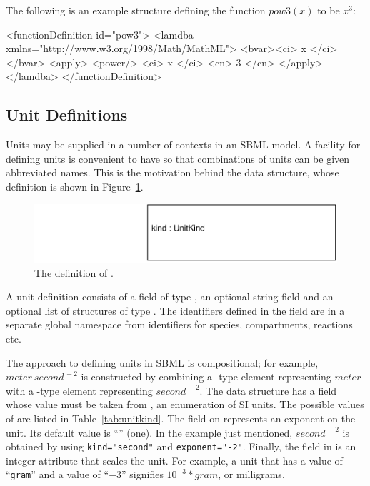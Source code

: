 \documentclass[10pt,twocolumntoc]{cekarticle}
\newcommand{\vref}[1]{\ref{#1}}
\begin{document}
The following is an example  structure defining
the function $pow3(x)$ to be $x^{3}$:

\begin{example}
<functionDefinition id="pow3">
    <lamdba xmlns="http://www.w3.org/1998/Math/MathML">
        <bvar><ci> x </ci></bvar>
        <apply>
            <power/>
            <ci> x </ci>
            <cn> 3 </cn>
        </apply>
    </lamdba>
</functionDefinition>
\end{example}

\subsection{Unit Definitions}
\label{sec:unitdefinitions}

Units may be supplied in a number of contexts in an SBML model.  A
facility for defining units is convenient to have so that
combinations of units can be given abbreviated names.  This is the
motivation behind the  data structure, whose
definition is shown in Figure~\vref{fig:unitdefinition}.

\begin{figure}[htb]
  \centering
  \includegraphics[scale = 0.68]{unitdefinition}
  \caption{The definition of .}
  \label{fig:unitdefinition}
\end{figure}

A unit definition consists of a  field of type
, an optional string field  and an
optional list of structures of type . The identifiers
defined in the  field are in a separate global
namespace from identifiers for species, compartments, reactions
etc.

The approach to defining units in SBML is compositional; for
example, $meter\ second^{\,-2}$ is constructed by combining a
-type element representing $meter$ with a
-type element representing $second^{\,-2}$.  The
 data structure has a  field whose value
must be taken from , an enumeration of SI units.
The possible values of  are listed in
Table~\vref{tab:unitkind}.  The  field on
 represents an exponent on the unit.  Its default
value is ``'' (one).  In the example just
mentioned, $second^{\,-2}$ is obtained by using
\texttt{kind="second"} and \texttt{exponent="-2"}. Finally, the
 field in  is an integer attribute that
scales the unit.  For example, a unit that has a 
value of ``\texttt{gram}'' and a  value of
``\texttt{$-3$}'' signifies $10^{-3} * gram$, or milligrams.
\end{document}
